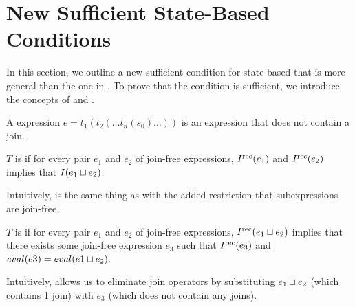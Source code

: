 \section{New Sufficient State-Based Conditions}

In this section, we outline a new sufficient condition for state-based
\Iconfluence{} that is more general than the one in
. To prove that the condition is sufficient, we
introduce the concepts of \dIconfluence{} and \dIreduction{}.

\begin{definition}
  A  expression $e = t_1(t_2(\ldots t_n(s_0) \ldots))$ is an
  expression that does not contain a join.
\end{definition}

\begin{definition}
  $T$ is  if for every pair $e_1$ and $e_2$ of
  join-free expressions, $I^{\text{rec}}(e_1)$ and $I^{\text{rec}}(e_2)$ implies that $I(e_1
  \sqcup e_2)$.
\end{definition}

Intuitively, \dIconfluence{} is the same thing as \Iconfluence{} with
the added restriction that subexpressions are join-free.

\begin{definition}
  $T$ is  if for every pair $e_1$ and $e_2$ of
  join-free expressions, $I^{\text{rec}}(e_1 \sqcup e_2)$ implies that there exists some
  join-free expression $e_3$ such that $I^{\text{rec}}(e_3)$ and $eval(e3) = eval(e1
  \sqcup e_2)$.
\end{definition}

Intuitively, \dIreduction{} allows us to eliminate join operators by
substituting $e_1 \sqcup e_2$ (which contains 1 join) with $e_3$ (which does not
contain any joins).

% 
%

